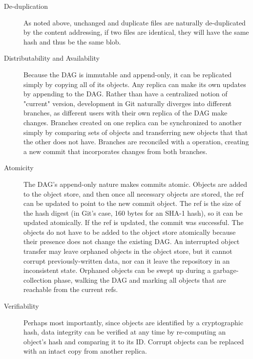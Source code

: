 \begin{description}

    \item[De-duplication] As noted above, unchanged and duplicate files are
        naturally de-duplicated by the content addressing, if two files are
        identical, they will have the same hash and thus be the same \gls{blob}.

    \item[Distributability and Availability] Because the \gls{DAG} is immutable
        and append-only, it can be replicated simply by copying all of its
        objects. Any replica can make its own updates by appending to the
        \gls{DAG}. Rather than have a centralized notion of "current" version,
        development in Git naturally diverges into different branches, as
        different users with their own replica of the \gls{DAG} make changes.
        Branches created on one replica can be synchronized to another simply by
        comparing sets of objects and transferring new objects that that the
        other does not have. Branches are reconciled with a 
        operation, creating a new \gls{commit} that incorporates changes from
        both branches.

    \item[Atomicity] The \gls{DAG}'s append-only nature makes \glspl{commit}
        atomic. Objects are added to the object store, and then once all
        necessary objects are stored, the ref can be updated to point to the new
        \gls{commit} object. The ref is the size of the hash digest (in Git's
        case, \num{160} bytes for an SHA-1 hash), so it can be updated
        atomically. If the ref is updated, the \gls{commit} was successful. The
        objects do not have to be added to the object store atomically because
        their presence does not change the existing \gls{DAG}. An interrupted
        object transfer may leave orphaned objects in the object store, but it
        cannot corrupt previously-written data, nor can it leave the repository
        in an inconsistent state. Orphaned objects can be swept up during a
        garbage-collection phase, walking the \gls{DAG} and marking all objects
        that are reachable from the current refs.

    \item[Verifiability] Perhaps most importantly, since objects are identified
        by a cryptographic hash, data integrity can be verified at any time by
        re-computing an object's hash and comparing it to its ID. Corrupt
        objects can be replaced with an intact copy from another replica.

\end{description}

